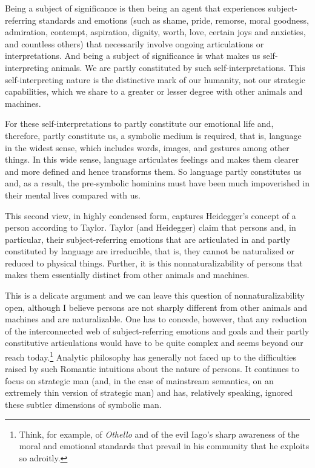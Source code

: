 Being a subject of significance is then being an agent that experiences subject-referring standards and emotions (such as shame, pride, remorse, moral goodness, admiration, contempt, aspiration, dignity, worth, love, certain joys and anxieties, and countless others) that necessarily involve ongoing articulations or interpretations. And being a subject of significance is what makes us self-interpreting animals. We are partly constituted by such self-interpretations. This self-interpreting nature is the distinctive mark of our humanity, not our strategic capabilities, which we share to a greater or lesser degree with other animals and machines.

For these self-interpretations to partly constitute our emotional life and, therefore, partly constitute us, a symbolic medium is required, that is, language in the widest sense, which includes words, images, and gestures among other things. In this wide sense, language articulates feelings and makes them clearer and more defined and hence transforms them.  So language partly constitutes us and, as a result, the pre-symbolic hominins must have been much impoverished in their mental lives compared with us.

This second view, in highly condensed form, captures Heidegger's concept of a person according to Taylor. Taylor (and Heidegger) claim that persons and, in particular, their subject-referring emotions that are articulated in and partly constituted by language are irreducible, that is, they cannot be naturalized or reduced to physical things. Further, it is this nonnaturalizability of persons that makes them essentially distinct from other animals and machines.

This is a delicate argument and we can leave this question of nonnaturalizability open, although I believe persons are not sharply different from other animals and machines and are naturalizable. One has to concede, however, that any reduction of the interconnected web of subject-referring emotions and goals and their partly constitutive articulations would have to be quite complex and seems beyond our reach today.\footnote{Think, for example, of \emph{Othello} and of the evil Iago's sharp awareness of the moral and emotional standards that prevail in his community that he exploits so adroitly.} Analytic philosophy has generally not faced up to the difficulties raised by such Romantic intuitions about the nature of persons. It continues to focus on strategic man (and, in the case of mainstream semantics, on an extremely thin version of strategic man) and has, relatively speaking, ignored these subtler dimensions of symbolic man.

